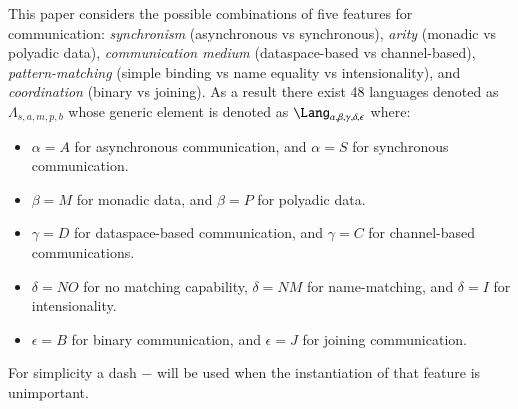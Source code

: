 \documentclass[submission,copyright,creativecommons]{eptcs}
\begin{document}
This paper considers the possible combinations of five features for communication:
{\em synchronism} (asynchronous vs synchronous),
{\em arity} (monadic vs polyadic data),
{\em communication medium} (dataspace-based vs channel-based),
{\em pattern-matching} (simple binding vs name equality vs intensionality),
and {\em coordination} (binary vs joining).
As a result there exist 48 languages denoted as $\Lambda_{s,a,m,p,b}$ whose generic element is denoted as $\Lang_{\alpha,\beta,\gamma,\delta,\epsilon}$ where:
\begin{itemize}
\item $\alpha = A$ for asynchronous communication, and $\alpha = S$ for synchronous communication.
\item $\beta = M$ for monadic data, and $\beta = P$ for polyadic data.
\item $\gamma = D$ for dataspace-based communication, and $\gamma = C$ for channel-based communications.
\item $\delta = \mathit{NO}$ for no matching capability, $\delta = \mathit{\mathit{NM}}$ for name-matching, and $\delta = I$ for intensionality.
\item $\epsilon = B$ for binary communication, and $\epsilon = J$ for joining communication.
\end{itemize}
For simplicity a dash $-$ will be used when the instantiation of that feature is unimportant.
\end{document}
